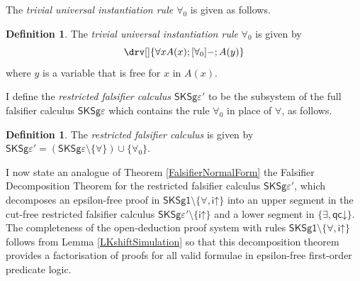 \documentclass[10pt]{article}
\theoremstyle{definition}\newtheorem{remark}[theorem]{Remark}
\theoremstyle{definition}\newtheorem{example}[theorem]{Example}
\theoremstyle{definition}\newtheorem{definition}[theorem]{Definition}
\newcommand{\SKSq}{{\mathsf{SKSg1}}}
\newcommand{\FalsifierCalculus}{{\mathsf{SKSg\varepsilon}}}
\newcommand{\FalsifierCalculusPrime}{{\mathsf{SKSg\varepsilon'}}}
\newcommand{\iUp}{{\mathsf{i\mathord\uparrow}}}
\newcommand{\qcDown}{{\mathsf{qc\mathord\downarrow}}}
\newcommand{\trivialForall}{\forall_0}
\begin{document}
	The \textit{trivial universal instantiation rule $\forall_0$} is given as follows.
	
	\begin{definition}
		The \textit{trivial universal instantiation rule} $\trivialForall$ is given by
		\[
		\drv[] {
			\forall x A(x) ; [\trivialForall]- ; A(y)
		}
		\]
		where $y$ is a variable that is free for $x$ in $A(x)$.
	\end{definition}

	I define the \textit{restricted falsifier calculus $\FalsifierCalculusPrime$} to be the subsystem of the full falsifier calculus $\FalsifierCalculus$ which contains the rule $\forall_0$ in place of $\forall$, as follows.
	
	\begin{definition}
		The \textit{restricted falsifier calculus} is given by $\FalsifierCalculusPrime = (\FalsifierCalculus \setminus \{\forall\}) \cup \{\trivialForall\}$.
	\end{definition}
	
	I now state an analogue of Theorem \ref{FalsifierNormalForm} the Falsifier Decomposition Theorem for the restricted falsifier calculus $\FalsifierCalculusPrime$, which decomposes an epsilon-free proof in $\SKSq \setminus \{\forall, \iUp\}$ into an upper segment in the cut-free restricted falsifier calculus $\FalsifierCalculusPrime \setminus \{ \iUp \}$ and a lower segment in $\{\exists, \qcDown\}$. The completeness of the open-deduction proof system with rules $\SKSq \setminus \{\forall, \iUp\}$ follows from Lemma \ref{LKshiftSimulation} so that this decomposition theorem provides a factorisation of proofs for all valid formulae in epsilon-free first-order predicate logic.
\end{document}
